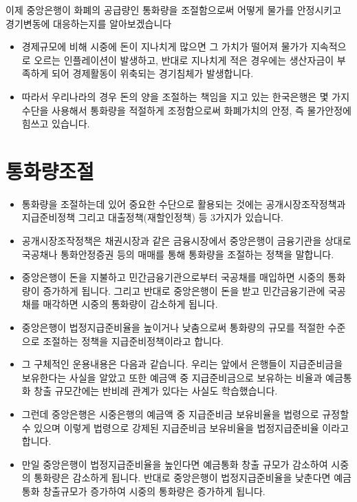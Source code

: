 \documentclass[
]{book}
\providecommand{\tightlist}{%
  \setlength{\itemsep}{0pt}\setlength{\parskip}{0pt}}
\begin{document}
이제 중앙은행이 화폐의 공급량인 통화량을 조절함으로써 어떻게 물가를 안정시키고 경기변동에 대응하는지를 알아보겠습니다

\begin{itemize}
\tightlist
\item
  경제규모에 비해 시중에 돈이 지나치게 많으면 그 가치가 떨어져 물가가 지속적으로 오르는 인플레이션이 발생하고, 반대로 지나치게 적은 경우에는 생산자금이 부족하게 되어 경제활동이 위축되는 경기침체가 발생합니다.\\
\item
  따라서 우리나라의 경우 돈의 양을 조절하는 책임을 지고 있는 한국은행은 몇 가지 수단을 사용해서 통화량을 적절하게 조정함으로써 화폐가치의 안정, 즉 물가안정에 힘쓰고 있습니다.
\end{itemize}

\hypertarget{uxd1b5uxd654uxb7c9uxc870uxc808}{%
\section{통화량조절}\label{uxd1b5uxd654uxb7c9uxc870uxc808}}

\begin{itemize}
\tightlist
\item
  통화량을 조절하는데 있어 중요한 수단으로 활용되는 것에는 공개시장조작정책과 지급준비정책 그리고 대출정책(재할인정책) 등 3가지가 있습니다.\\
\item
  공개시장조작정책은 채권시장과 같은 금융시장에서 중앙은행이 금융기관을 상대로 국공채나 통화안정증권 등의 매매를 통해 통화량을 조절하는 정책을 말합니다.\\
\item
  중앙은행이 돈을 지불하고 민간금융기관으로부터 국공채를 매입하면 시중의 통화량이 증가하게 됩니다. 그리고 반대로 중앙은행이 돈을 받고 민간금융기관에 국공채를 매각하면 시중의 통화량이 감소하게 됩니다.\\
\item
  중앙은행이 법정지급준비율을 높이거나 낮춤으로써 통화량의 규모를 적절한 수준으로 조절하는 정책을 지급준비정책이라고 합니다.\\
\item
  그 구체적인 운용내용은 다음과 같습니다. 우리는 앞에서 은행들이 지급준비금을 보유한다는 사실을 알았고 또한 예금액 중 지급준비금으로 보유하는 비율과 예금통화 창출 규모간에는 반비례 관계가 있다는 사실도 학습했습니다.\\
\item
  그런데 중앙은행은 시중은행의 예금액 중 지급준비금 보유비율을 법령으로 규정할 수 있으며 이렇게 법령으로 강제된 지급준비금 보유비율을 법정지급준비율 이라고 합니다.\\
\item
  만일 중앙은행이 법정지급준비율을 높인다면 예금통화 창출 규모가 감소하여 시중의 통화량은 감소하게 됩니다. 반대로 중앙은행이 법정지급준비율을 낮춘다면 예금통화 창출규모가 증가하여 시중의 통화량은 증가하게 됩니다.
\end{itemize}
\end{document}
